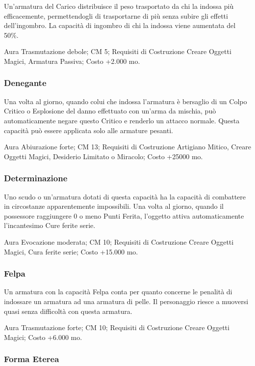 \begin{multicols}{2}
Un'armatura del Carico distribuisce il peso trasportato da chi la indossa più efficacemente, permettendogli di trasportarne di più senza subire gli effetti dell'ingombro. La capacità di ingombro di chi la indossa viene aumentata del 50\%.

Aura Trasmutazione debole; CM 5; Requisiti di Costruzione Creare Oggetti Magici, Armatura Passiva; Costo +2.000 mo.

\subsubsection{Denegante}

Una volta al giorno, quando colui che indossa l'armatura è bersaglio di un Colpo Critico o Esplosione del danno effettuato con un'arma da mischia, può automaticamente negare questo Critico e renderlo un attacco normale. Questa capacità può essere applicata solo alle armature pesanti.

Aura Abiurazione forte; CM 13; Requisiti di Costruzione Artigiano Mitico, Creare Oggetti Magici, Desiderio Limitato o Miracolo; Costo +25000 mo.

\subsubsection{Determinazione}

Uno scudo o un'armatura dotati di questa capacità ha la capacità di combattere in circostanze apparentemente impossibili. Una volta al giorno, quando il possessore raggiungere 0 o meno Punti Ferita, l'oggetto attiva automaticamente l'incantesimo Cure ferite serie.

Aura Evocazione moderata; CM 10; Requisiti di Costruzione Creare Oggetti Magici, Cura ferite serie; Costo +15.000 mo.

\subsubsection{Felpa}

Un armatura con la capacità Felpa conta per quanto concerne le penalità di indossare un armatura ad una armatura di pelle. Il personaggio riesce a muoversi quasi senza difficoltà con questa armatura.

Aura Trasmutazione forte; CM 10; Requisiti di Costruzione Creare Oggetti Magici; Costo +6.000 mo.

\subsubsection{Forma Eterea}


\end{multicols}
